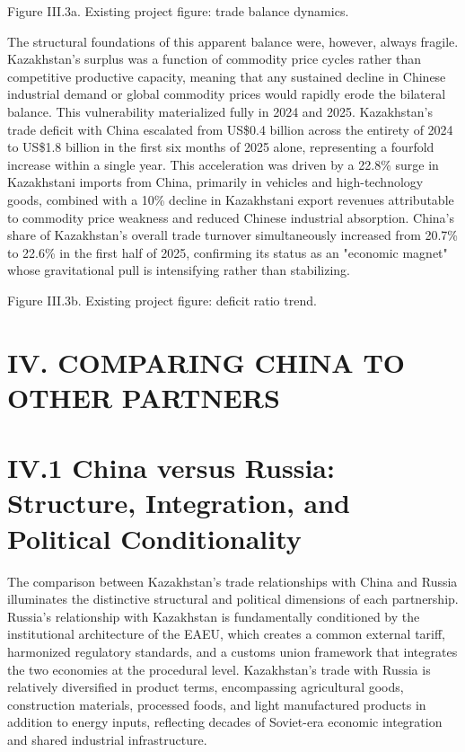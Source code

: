 \documentclass[12pt]{article}
\begin{document}
Figure III.3a. Existing project figure: trade balance dynamics.\par
The structural foundations of this apparent balance were, however, always fragile. Kazakhstan's surplus was a function of commodity price cycles rather than competitive productive capacity, meaning that any sustained decline in Chinese industrial demand or global commodity prices would rapidly erode the bilateral balance. This vulnerability materialized fully in 2024 and 2025. Kazakhstan's trade deficit with China escalated from US\$0.4 billion across the entirety of 2024 to US\$1.8 billion in the first six months of 2025 alone, representing a fourfold increase within a single year. This acceleration was driven by a 22.8\% surge in Kazakhstani imports from China, primarily in vehicles and high-technology goods, combined with a 10\% decline in Kazakhstani export revenues attributable to commodity price weakness and reduced Chinese industrial absorption. China's share of Kazakhstan's overall trade turnover simultaneously increased from 20.7\% to 22.6\% in the first half of 2025, confirming its status as an "economic magnet" whose gravitational pull is intensifying rather than stabilizing.\par

Figure III.3b. Existing project figure: deficit ratio trend.\par

\section{IV. COMPARING CHINA TO OTHER PARTNERS}

\section{IV.1 China versus Russia: Structure, Integration, and Political Conditionality}

The comparison between Kazakhstan's trade relationships with China and Russia illuminates the distinctive structural and political dimensions of each partnership. Russia's relationship with Kazakhstan is fundamentally conditioned by the institutional architecture of the EAEU, which creates a common external tariff, harmonized regulatory standards, and a customs union framework that integrates the two economies at the procedural level. Kazakhstan's trade with Russia is relatively diversified in product terms, encompassing agricultural goods, construction materials, processed foods, and light manufactured products in addition to energy inputs, reflecting decades of Soviet-era economic integration and shared industrial infrastructure.\par
\end{document}
